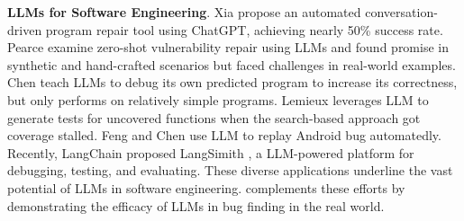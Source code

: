 
\vspace{3pt}
\noindent \textbf{\acp{LLM} for Software Engineering}. 
Xia \etal \cite{xia_keep_2023} propose an automated conversation-driven
program repair tool using ChatGPT, achieving nearly 50\% success rate. 
Pearce \etal \cite{pearce_examining_2023} examine zero-shot vulnerability
repair using LLMs and found promise in synthetic and hand-crafted scenarios but
faced challenges in real-world examples.
Chen \etal \cite{chen_teaching_2023} teach LLMs to debug its own predicted program to increase its correctness, but only
performs on relatively simple programs.
Lemieux \etal \cite{lemieux_codamosa_2023} leverages LLM to generate
tests for uncovered functions when the search-based approach got coverage stalled. 
Feng and Chen \cite{feng_prompting_2023} use LLM to replay Android bug automatedly.
Recently, LangChain proposed LangSimith \cite{langchain_2023_announcing_2023}, a LLM-powered platform
for debugging, testing, and evaluating. 
These diverse applications underline the vast potential of LLMs in software engineering. \work complements these efforts by demonstrating the efficacy of LLMs in bug finding in the real world.

